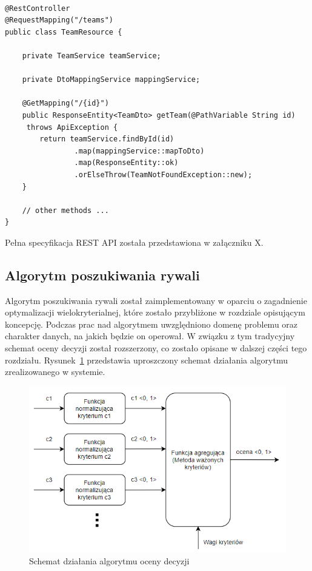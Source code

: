 \begin{minipage}{\linewidth}
\begin{lstlisting}[label=list:resource, caption=Przykładowa rejestracja kontrolera, basicstyle=\footnotesize\ttfamily]

@RestController
@RequestMapping("/teams")
public class TeamResource {

    private TeamService teamService;

    private DtoMappingService mappingService;

    @GetMapping("/{id}")
    public ResponseEntity<TeamDto> getTeam(@PathVariable String id)
     throws ApiException {
        return teamService.findById(id)
                .map(mappingService::mapToDto)
                .map(ResponseEntity::ok)
                .orElseThrow(TeamNotFoundException::new);
    }
    
    // other methods ...
}

\end{lstlisting}
\end{minipage}

Pełna specyfikacja REST API została przedstawiona w załączniku X.

\subsection{Algorytm poszukiwania rywali}

Algorytm poszukiwania rywali został zaimplementowany w oparciu o zagadnienie optymalizacji wielokryterialnej, które zostało przybliżone w rozdziale opisującym koncepcję. Podczas prac nad algorytmem uwzględniono domenę problemu oraz charakter danych, na jakich będzie on operował. W związku z tym tradycyjny schemat oceny decyzji został rozszerzony, co zostało opisane w dalszej części tego rozdziału. Rysunek~\ref{fig:diagram-alg-ext} przedstawia uproszczony schemat działania algorytmu zrealizowanego w systemie.

\begin{figure}[H]
\centering
\includegraphics[width=0.8\linewidth]{03-koncept/rys/algorytm.PNG}
\caption{Schemat działania algorytmu oceny decyzji}
\label{fig:diagram-alg-ext}
\end{figure}

